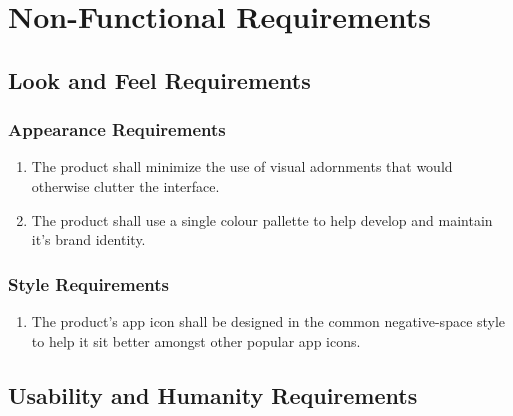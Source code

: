 \documentclass[]{article}
\begin{document}

\section{Non-Functional Requirements}
\label{sec:non-functional_requirements}

\newcommand{\holdEnum}{\setcounter{_enumi}{\value{enumi}}}
\newcommand{\resumeEnum}{\setcounter{enumi}{\value{_enumi}}}

\subsection{Look and Feel Requirements}
\label{sub:look_and_feel_requirements}

\subsubsection{Appearance Requirements}
\label{ssub:appearance_requirements}
\begin{enumerate}[{LF}1. ]
	\item The product shall minimize the use of visual adornments that would otherwise clutter the interface.
	\item The product shall use a single colour pallette to help develop and maintain it's brand identity.
	\holdEnum
\end{enumerate}

\subsubsection{Style Requirements}
\label{ssub:style_requirements}
\begin{enumerate}[{LF}1.]
	\resumeEnum
	\item The product's app icon shall be designed in the common negative-space style to help it sit better amongst other popular app icons.  
\end{enumerate}


\subsection{Usability and Humanity Requirements}
\label{sub:usability_and_humanity_requirements}
\end{document}
